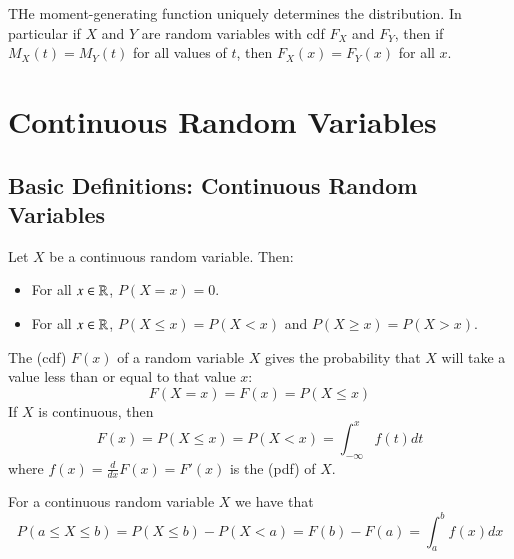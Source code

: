 \documentclass[12pt]{report}
\begin{document}
\begin{rmk}{}{}
    THe moment-generating function uniquely determines the distribution. In particular if $X$ and $Y$ are random variables with cdf $F_X$ and $F_Y$, then if $M_X(t) = M_Y(t)$ for all values of $t$, then $F_X(x) = F_Y(x)$ for all $x$.
\end{rmk}
     



\chapter{Continuous Random Variables}


\section{Basic Definitions: Continuous Random Variables}

\begin{props}{}{}
    Let $X$ be a continuous random variable. Then: \begin{itemize}
        \item For all $x \in \mathbb R$, $P(X= x) = 0$.
        \item For all $x \in \mathbb R$, $P(X\leq x) = P(X < x)$ and $P(X\geq x) = P(X > x)$.
    \end{itemize}
\end{props}


\begin{defn}{}{}
    The  (cdf) $F(x)$ of a random variable $X$ gives the probability that $X$ will take a value less than or equal to that value $x$: \begin{equation*}
        F(X = x) = F(x) = P(X\leq x)
    \end{equation*}
    If $X$ is continuous, then \begin{equation*}
        F(x) = P(X\leq x) = P(X < x) = \int_{-\infty}^xf(t)dt
    \end{equation*}
    where $f(x) = \frac{d}{dx}F(x) = F'(x)$ is the  (pdf) of $X$.
\end{defn}

\begin{rmk}{}{}
    For a continuous random variable $X$ we have that \begin{equation*}
        P(a\leq X\leq b) = P(X\leq b) - P(X<a) = F(b)-F(a) = \int_a^bf(x)dx
    \end{equation*}
\end{rmk}
\end{document}
